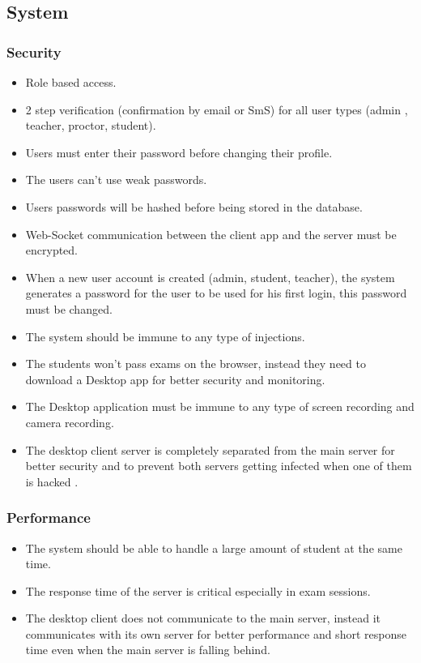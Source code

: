 \documentclass[]{uc2pfecaneva}
\begin{document}
\raggedright\subsection{System}

\raggedright\subsubsection{Security}
\begin{itemize}
	\item Role based access.
	\item 2 step verification (confirmation by email or SmS) for all user types (admin , teacher, proctor, student).
	\item Users must enter their password before changing their profile.
	\item The users can't use weak passwords.
	\item Users passwords will be hashed before being stored in the database.
	\item Web-Socket communication between the client app and the server must be encrypted.
	\item When a new user account is created (admin, student, teacher), the system generates a password for the user to be used for his first login, this password must be changed.
	\item The system should be immune to any type of injections.
	\item The students won’t pass exams on the browser, instead they need to download a Desktop app for better security and monitoring.
	\item The Desktop application must be immune to any type of screen recording and camera recording.
	\item The desktop client server is completely separated from the main server for better security and to prevent both servers getting infected when one of them is hacked .
\end{itemize}

\raggedright\subsubsection{Performance}
\begin{itemize}
	\item The system should be able to handle a large amount of student at the same time.
	\item The response time of the server is critical especially in exam sessions.
	\item The desktop client does not communicate to the main server, instead it communicates with its own server for better performance and short response time even when the main server is falling behind.
\end{itemize}
\end{document}
